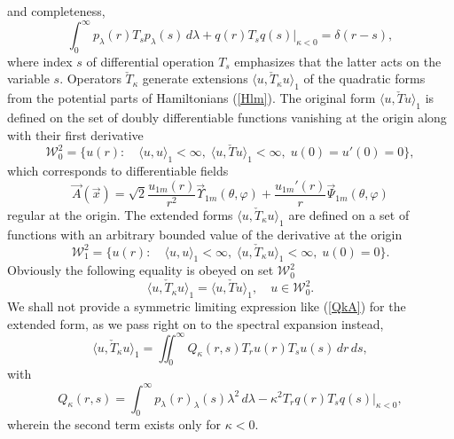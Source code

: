 \documentclass[12pt]{article}
\newcommand{\WW}{\mathscr{W}}
\begin{document}
	and completeness,
\begin{equation*}
    \int_{0}^{\infty} p_{\lambda}(r) T_{s} p_{\lambda}(s) \,d\lambda
        + q(r) T_{s} q(s)\bigr|_{\kappa < 0} = \delta(r-s) ,
\end{equation*}
	where index
$ s $
	of differential operation
$ T_{s} $
	emphasizes that the latter acts on the variable
$ s $.
	Operators
$ \check{T}_{\kappa} $
	generate extensions
$ \langle u, \check{T}_{\kappa} u\rangle_{1} $
	of the quadratic forms from the potential parts of Hamiltonians
(\ref{Hlm}).
	The original form
$ \langle u, \check{T} u\rangle_{1} $
	is defined on the set of doubly differentiable functions
	vanishing at the origin along with their first derivative
\begin{equation*}
    \WW^{2}_{0} = \{u(r):\quad \langle u,u\rangle_{1} <\infty, \;
	\langle u, \check{T}u\rangle_{1} < \infty, \; u(0)=u'(0) =0 \} ,
\end{equation*}
	which corresponds to differentiable fields
\begin{equation}
\label{Atrns}
    \vec{A}(\vec{x}) =
        \sqrt{2}
	    \frac{u_{1m}(r)}{r^{2}} \vec{\Upsilon}_{1m}(\theta,\varphi) +
        \frac{u_{1m}'(r)}{r} \vec{\Psi}_{1m}(\theta,\varphi)
\end{equation}
	regular at the origin.
	The extended forms
$ \langle u, \check{T}_{\kappa} u\rangle_{1} $
	are defined on a set of functions with an arbitrary bounded value
	of the derivative at the origin
\begin{equation*}
    \WW^{2}_{1} = \{u(r):\quad \langle u,u\rangle_{1} <\infty, \;
	\langle u, \check{T}_{\kappa}u\rangle_{1} < \infty, \; u(0)=0 \} .
\end{equation*}
	Obviously the following equality is obeyed on set
$ \WW^{2}_{0} $
\begin{equation*}
    \langle u, \check{T}_{\kappa} u\rangle_{1}= \langle u,
	\check{T} u\rangle_{1} ,\quad u \in \WW^{2}_{0} .
\end{equation*}
	We shall not provide a symmetric limiting expression like
(\ref{QkA})
    for the extended
	form, as we pass right on to the spectral expansion instead,
\begin{equation*}
    \langle u, \check{T}_{\kappa} u\rangle_{1}
    = \iint_{0}^{\infty} Q_{\kappa}(r,s) T_{r}u(r) T_{s}u(s) \,dr\,ds ,
\end{equation*}
	with
\begin{equation*}
    Q_{\kappa}(r,s) = \int_{0}^{\infty} p_{\lambda}(r)
    	_{\lambda}(s) \lambda^{2} \,d\lambda
        - \kappa^{2} T_{r} q(r) T_{s} q(s) \bigr|_{\kappa <0} ,
\end{equation*}
	wherein the second term exists only for
$ \kappa < 0 $.
\end{document}

